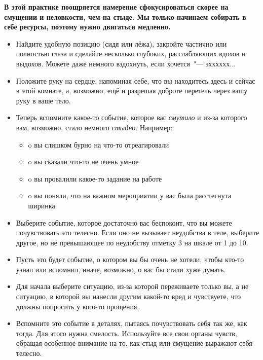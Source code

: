 \vspace{2ex}

\textbf{В этой практике поощряется намерение сфокусироваться скорее на смущении и неловкости, чем на стыде. Мы только начинаем собирать в себе ресурсы, поэтому нужно двигаться медленно.}

\begin{itemize}
	\item Найдите удобную позицию (сидя или лёжа), закройте частично или полностью глаза и сделайте несколько глубоких, расслабляющих вдохов и выдохов. Можете даже немного вздохнуть, если хочется~"--- эхххххх...
	
	\item Положите руку на сердце, напоминая себе, что вы находитесь здесь и сейчас в этой комнате, а, возможно, ещё и разрешая доброте перетечь через вашу руку в ваше тело.
	
	\item Теперь вспомните какое-то событие, которое вас \emph{смутило} и из-за которого вам, возможно, стало немного \emph{стыдно}. Например:
	\begin{itemize}
		\item o	вы слишком бурно на что-то отреагировали
		\item o	вы сказали что-то не очень умное
		\item o	вы провалили какое-то задание на работе
		\item o	вы поняли, что на важном мероприятии у вас была расстегнута ширинка
	\end{itemize}

	\item Выберите событие, которое достаточно вас беспокоит, что вы можете почувствовать это телесно. Если оно не вызывает неудобства в теле, выберите другое, но не превышающее по неудобству отметку 3 на шкале от 1 до 10.
	
	\item Пусть это будет событие, о котором вы бы очень не хотели, чтобы кто-то узнал или вспомнил, иначе, возможно, о вас бы стали хуже думать.
	
	\item Для начала выберите ситуацию, из-за которой переживаете только вы, а не ситуацию, в которой вы нанесли другим какой-то вред и чувствуете, что должны попросить у кого-то прощения.
	
	\item Вспомните это событие в деталях, пытаясь почувствовать себя так же, как тогда. Для этого нужна смелость. Используйте все свои органы чувств, обращая особенное внимание на то, как стыд или смущение выражают себя телесно.
\end{itemize}

